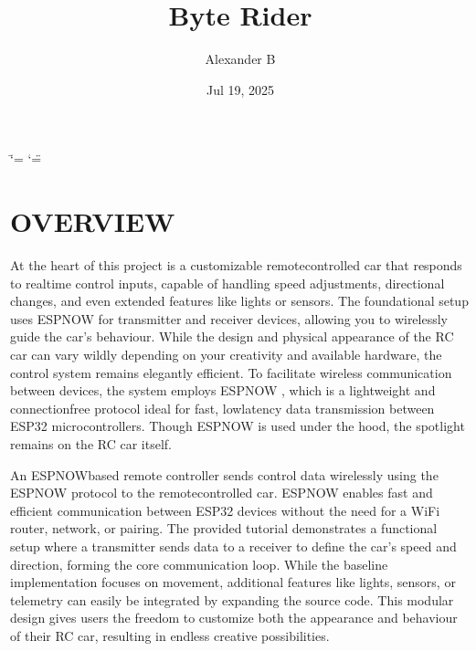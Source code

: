 \documentclass[letterpaper,10pt,english]{sphinxmanual}
\title{Byte Rider}
\date{Jul 19, 2025}
\author{Alexander B}
\begin{document}
\ifdefined\shorthandoff
  \ifnum\catcode`\=\string=\active\shorthandoff{=}\fi
  \ifnum\catcode`\"=\active{}\fi
\fi

\pagestyle{empty}
\sphinxmaketitle
\pagestyle{plain}
\sphinxtableofcontents
\pagestyle{normal}
\label{\detokenize{index::doc}}


\noindent{}

\sphinxstepscope


\chapter{OVERVIEW}
\label{\detokenize{intro:overview}}\label{\detokenize{intro::doc}}
\sphinxAtStartPar
At the heart of this project is a customizable remote\sphinxhyphen{}controlled car that responds to real\sphinxhyphen{}time control inputs, capable of handling speed adjustments,
directional changes, and even extended features like lights or sensors. The foundational setup uses ESP\sphinxhyphen{}NOW for transmitter and receiver devices,
allowing you to wirelessly guide the car’s behaviour. While the design and physical appearance of the RC car can vary wildly depending on your
creativity and available hardware, the control system remains elegantly efficient. To facilitate wireless communication between devices, the system employs
ESP\sphinxhyphen{}NOW , which is a lightweight and connection\sphinxhyphen{}free protocol ideal for fast, low\sphinxhyphen{}latency data transmission between ESP32 microcontrollers. Though ESP\sphinxhyphen{}NOW is used under
the hood, the spotlight remains on the RC car itself.

\sphinxAtStartPar
An ESP\sphinxhyphen{}NOW\sphinxhyphen{}based remote controller sends control data wirelessly using the ESP\sphinxhyphen{}NOW protocol to the remote\sphinxhyphen{}controlled car. ESP\sphinxhyphen{}NOW enables fast and
efficient communication between ESP32 devices without the need for a Wi\sphinxhyphen{}Fi router, network, or pairing. The provided tutorial demonstrates a functional
setup where a transmitter sends data to a receiver to define the car’s speed and direction, forming the core communication loop. While the baseline
implementation focuses on movement, additional features like lights, sensors, or telemetry can easily be integrated by expanding the source code. This
modular design gives users the freedom to customize both the appearance and behaviour of their RC car, resulting in endless creative possibilities.
\end{document}
